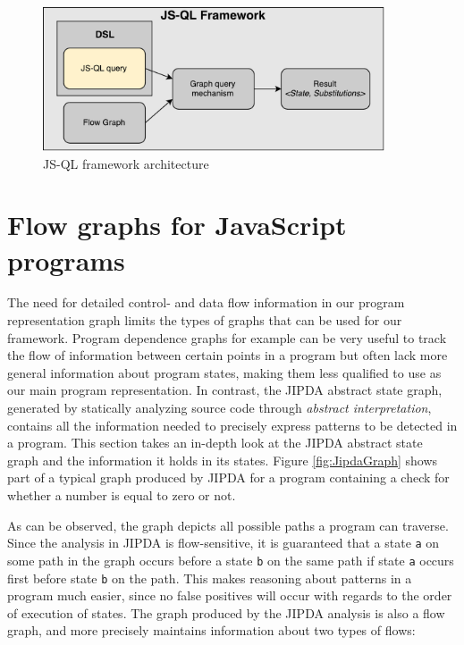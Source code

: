 \begin{figure}
    \centering
      \includegraphics[width=0.9\textwidth]{images/Architecture} 
      \caption{JS-QL framework architecture}
    \label{fig:architecture}
\end{figure}
\section{Flow graphs for JavaScript programs}

The need for detailed control- and data flow information in our program representation graph limits the types of graphs that can be used for our framework. Program dependence graphs\cite{PDG} for example can be very useful to track the flow of information between certain points in a program but often lack more general information about program states, making them less qualified to use as our main program representation. In contrast, the JIPDA\cite{functionPurity} abstract state graph, generated by statically analyzing source code through \textit{abstract interpretation}, contains all the information needed to precisely express patterns to be detected in a program. This section takes an in-depth look at the JIPDA abstract state graph and the information it holds in its states. Figure \ref{fig:JipdaGraph} shows part of a typical graph produced by JIPDA for a program containing a check for whether a number is equal to zero or not.

As can be observed, the graph depicts all possible paths a program can traverse. Since the analysis in JIPDA is flow-sensitive, it is guaranteed that a state \texttt{a} on some path in the graph occurs before a state \texttt{b} on the same path if state \texttt{a} occurs first before state \texttt{b} on the path. This makes reasoning about patterns in a program much easier, since no false positives will occur with regards to the order of execution of states. The graph produced by the JIPDA analysis is also a flow graph, and more precisely maintains information about two types of flows:

